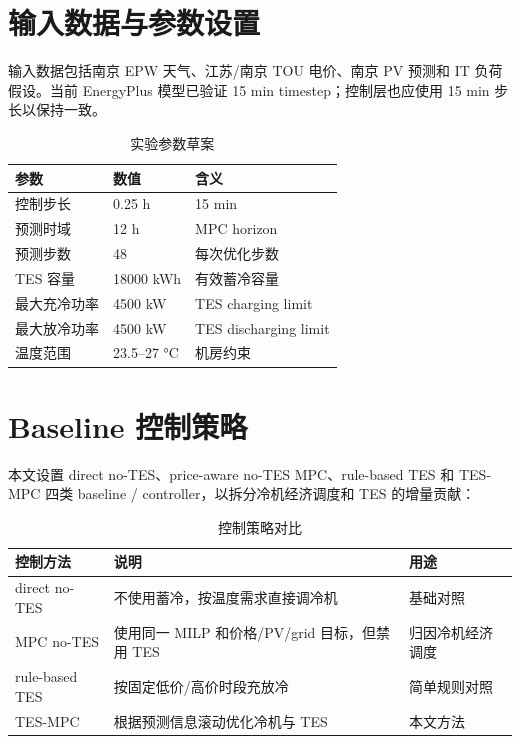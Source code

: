 \documentclass[UTF8,a4paper,12pt]{ctexrep}
\begin{document}
\section{输入数据与参数设置}

输入数据包括南京 EPW 天气、江苏/南京 TOU 电价、南京 PV 预测和 IT 负荷假设。当前 EnergyPlus 模型已验证 15 min timestep；控制层也应使用 15 min 步长以保持一致。

\begin{table}[htbp]
  \centering
  \caption{实验参数草案}
  \begin{tabular}{lll}
    \toprule
    参数 & 数值 & 含义 \\
    \midrule
    控制步长 & 0.25 h & 15 min \\
    预测时域 & 12 h & MPC horizon \\
    预测步数 & 48 & 每次优化步数 \\
    TES 容量 & 18000 kWh & 有效蓄冷容量 \\
    最大充冷功率 & 4500 kW & TES charging limit \\
    最大放冷功率 & 4500 kW & TES discharging limit \\
    温度范围 & 23.5--27 \si{\degreeCelsius} & 机房约束 \\
    \bottomrule
  \end{tabular}
\end{table}

\section{Baseline 控制策略}

本文设置 direct no-TES、price-aware no-TES MPC、rule-based TES 和 TES-MPC 四类 baseline / controller，以拆分冷机经济调度和 TES 的增量贡献：

\begin{table}[htbp]
  \centering
  \caption{控制策略对比}
  \begin{tabular}{lll}
    \toprule
    控制方法 & 说明 & 用途 \\
    \midrule
    direct no-TES & 不使用蓄冷，按温度需求直接调冷机 & 基础对照 \\
    MPC no-TES & 使用同一 MILP 和价格/PV/grid 目标，但禁用 TES & 归因冷机经济调度 \\
    rule-based TES & 按固定低价/高价时段充放冷 & 简单规则对照 \\
    TES-MPC & 根据预测信息滚动优化冷机与 TES & 本文方法 \\
    \bottomrule
  \end{tabular}
\end{table}
\end{document}
